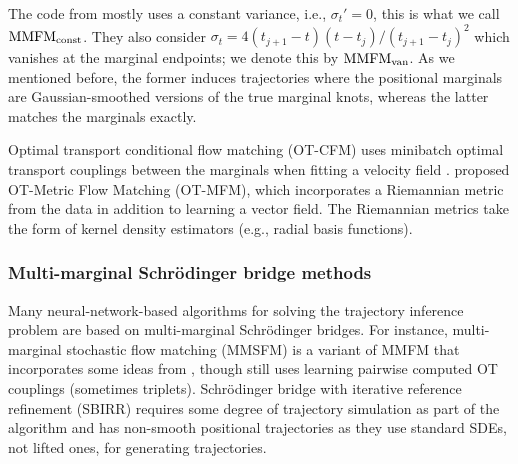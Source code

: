 \documentclass[12pt]{article}
\theoremstyle{plain}
\theoremstyle{plain}
\theoremstyle{remark}
\newcommand{\1}{\bm{1}}
\theoremstyle{plain}
\theoremstyle{definition}
\theoremstyle{remark}
\begin{document}
The code from \citet{rohbeck2025modeling} mostly uses a constant variance, i.e., $\sigma_t' = 0$, this is what we call ${\rm MMFM}_{\rm const}$. They also consider $\sigma_t = 4(t_{j+1}-t)(t - t_j)/(t_{j+1}-t_j)^2$ which vanishes at the marginal endpoints; we denote this by ${\rm MMFM}_{\rm van}$. As we mentioned before, the former induces trajectories where the positional marginals are Gaussian-smoothed versions of the true marginal knots, whereas the latter matches the marginals exactly.

Optimal transport conditional flow matching (OT-CFM) uses minibatch optimal transport couplings between the marginals when fitting a velocity field \citep{tong2023improving,pooladian2023multisample}. \cite{kapusniak2024metric} proposed OT-Metric Flow Matching (OT-MFM), which incorporates a Riemannian metric from the data in addition to learning a vector field. The Riemannian metrics take the form of kernel density estimators (e.g., radial basis functions).

\subsubsection*{Multi-marginal Schr\"odinger bridge methods}
 Many neural-network-based algorithms for solving the trajectory inference problem are based on multi-marginal Schr\"odinger bridges. For instance, multi-marginal stochastic flow matching (MMSFM) \citep{lee2025multi} is a variant of MMFM that incorporates some ideas from \citet{shi2024diffusion}, though still uses learning pairwise computed OT couplings (sometimes triplets). Schr\"odinger bridge with iterative reference refinement (SBIRR) \citep{shen2024multi} requires some degree of trajectory simulation as part of the algorithm and has non-smooth positional trajectories as they use standard SDEs, not lifted ones, for generating trajectories.
\end{document}
